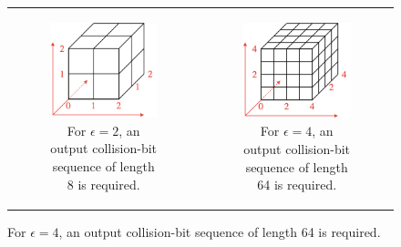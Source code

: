 \begin{figure}
\begin{centering}
\begin{tabular}{c c}

    \begin{subfigure}{0.4\linewidth}
    \includegraphics[width=\linewidth]{chapters/chapter3/img/honeybee_epsilon_grids_a.png}
    \caption{For $\epsilon=2$, an output collision-bit sequence of length 8 is required.}
    \end{subfigure} & 

    \begin{subfigure}{0.4\linewidth}
    \includegraphics[width=\linewidth]{chapters/chapter3/img/honeybee_epsilon_grids_b.png}
    \caption{For $\epsilon=4$, an output collision-bit sequence of length 64 is required.}
    \end{subfigure} \\    


\end{tabular}
\end{centering}
\end{figure}

